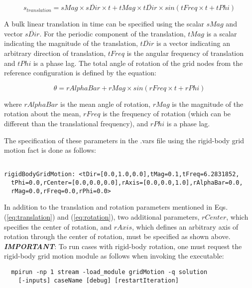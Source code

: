 \documentclass{article}
\begin{document}
\begin{equation}
  s_{translation} = sMag \times \overline{sDir} \times t + tMag \times
    \overline{tDir} \times sin(tFreq \times t + tPhi)
  \label{eq:translation}
\end{equation}

A bulk linear translation in time can be specified using the scalar $sMag$ and
vector $\overline{sDir}$. For the periodic component of the translation, $tMag$
 is a scalar indicating the magnitude of the translation,
$\overline{tDir}$ is a vector indicating an arbitrary direction of translation,
$tFreq$ is the angular frequency of translation and $tPhi$ is a phase lag. The
total angle of rotation of the grid nodes from the reference configuration is
defined by the equation:

\begin{equation}
  \theta = rAlphaBar + rMag \times sin ( rFreq \times t + rPhi )
  \label{eq:rotation}
\end{equation}

where $rAlphaBar$ is the mean angle of rotation, $rMag$ is the magnitude of the
rotation about the mean, $rFreq$ is the frequency of rotation (which can be
different than the translational frequency), and $rPhi$ is a phase lag.

The specification of these parameters in the .vars file using the rigid-body
grid motion fact is done as follows:

\begin{verbatim}

rigidBodyGridMotion: <tDir=[0.0,1.0,0.0],tMag=0.1,tFreq=6.2831852,
  tPhi=0.0,rCenter=[0.0,0.0,0.0],rAxis=[0.0,0.0,1.0],rAlphaBar=0.0,
  rMag=0.0,rFreq=0.0,rPhi=0.0>

\end{verbatim} 

In addition to the translation and rotation parameters mentioned in Eqs.
(\ref{eq:translation}) and (\ref{eq:rotation}), two additional parameters,
$rCenter$, which specifies the center of rotation, and $rAxis$, which defines
an arbitrary axis of rotation through the center of rotation, must be specified
as shown above. \emph{\bf IMPORTANT}: To run cases with rigid-body rotation,
one must request the rigid-body grid motion module as follows when invoking the
executable:
\begin{verbatim}
  mpirun -np 1 stream -load_module gridMotion -q solution
    [-inputs] caseName [debug] [restartIteration]
\end{verbatim}
\end{document}
